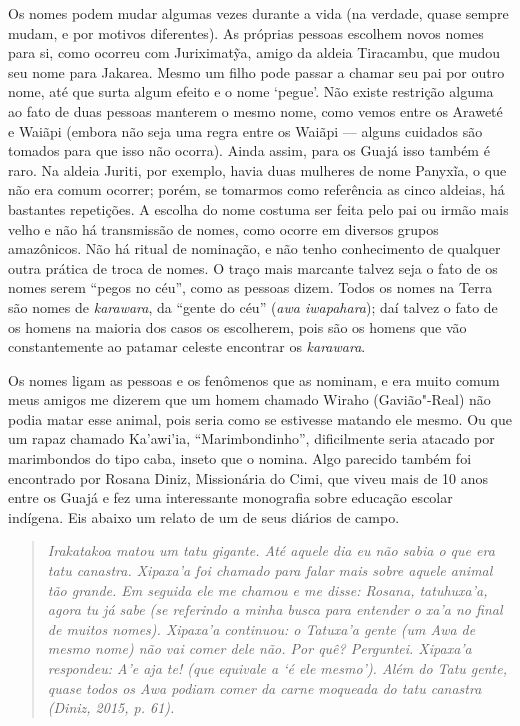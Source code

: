 Os nomes podem mudar algumas vezes durante a vida (na verdade, quase
sempre mudam, e por motivos diferentes). As próprias pessoas escolhem
novos nomes para si, como ocorreu com Juriximatỹa, amigo da aldeia
Tiracambu, que mudou seu nome para Jakarea. Mesmo um filho pode passar a
chamar seu pai por outro nome, até que surta algum efeito e o nome
`pegue'. Não existe restrição alguma ao fato de duas pessoas manterem o
mesmo nome, como vemos entre os Araweté e Waiãpi (embora não seja uma
regra entre os Waiãpi --- alguns cuidados são tomados para que isso não
ocorra). Ainda assim, para os Guajá isso também é raro. Na aldeia
Juriti, por exemplo, havia duas mulheres de nome Panyxĩa, o que não era
comum ocorrer; porém, se tomarmos como referência as cinco aldeias, há
bastantes repetições. A escolha do nome costuma ser feita pelo pai ou
irmão mais velho e não há transmissão de nomes, como ocorre em diversos
grupos amazônicos. Não há ritual de nominação, e não tenho conhecimento
de qualquer outra prática de troca de nomes. O traço mais marcante
talvez seja o fato de os nomes serem ``pegos no céu'', como as pessoas
dizem. Todos os nomes na Terra são nomes de \emph{karawara}, da ``gente
do céu'' (\emph{awa iwapahara}); daí talvez o fato de os homens na
maioria dos casos os escolherem, pois são os homens que vão
constantemente ao patamar celeste encontrar os \emph{karawara}.

Os nomes ligam as pessoas e os fenômenos que as nominam, e era muito
comum meus amigos me dizerem que um homem chamado Wiraho (Gavião"-Real)
não podia matar esse animal, pois seria como se estivesse matando ele
mesmo. Ou que um rapaz chamado Ka'awi'ia, ``Marimbondinho'',
dificilmente seria atacado por marimbondos do tipo caba, inseto que o
nomina. Algo parecido também foi encontrado por Rosana Diniz,
Missionária do Cimi, que viveu mais de 10 anos entre os Guajá e fez uma
interessante monografia sobre educação escolar indígena. Eis abaixo um
relato de um de seus diários de campo.

\begin{quote}
\emph{Irakatakoa matou um tatu gigante. Até aquele dia eu não sabia o que era
tatu canastra. Xipaxa'a foi chamado para falar mais sobre aquele animal
tão grande. Em seguida ele me chamou e me disse: Rosana, tatuhuxa'a,
agora tu já sabe (se referindo a minha busca para entender o \emph{xa'a}
no final de muitos nomes). Xipaxa'a continuou: o Tatuxa'a gente (um Awa
de mesmo nome) não vai comer dele não. Por quê? Perguntei. Xipaxa'a
respondeu: \emph{A'e aja te!} (que equivale a `é ele mesmo'). Além do
Tatu gente, quase todos os Awa podiam comer da carne moqueada do tatu
canastra (Diniz, 2015, p. 61).}
\end{quote}


